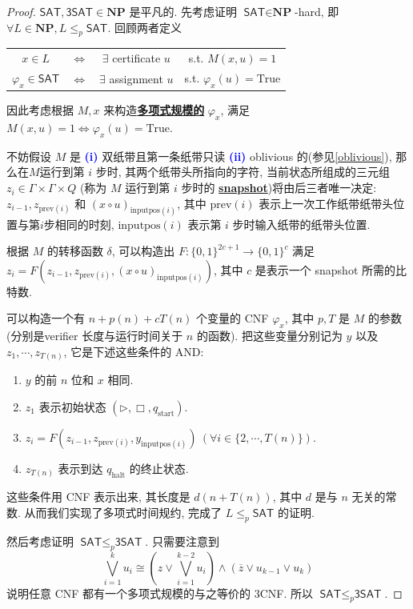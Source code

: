 \documentclass[8pt]{article}
\theoremstyle{compact}
\def\obj#1{\textbf{\uline{#1}}}
\def\num#1{\textnormal{\textbf{\mbox{\textcolor{blue}{(#1)}}}}}
\def\le{\leqslant}
\def\NP{\textbf{NP}}
\begin{document}
\begin{proof}
	$\textsf{SAT}, \textsf{3SAT} \in \NP$ 是平凡的. 先考虑证明 $\textsf{SAT} \in \NP$-hard, 即 $\forall L \in \NP, L \le_p \textsf{SAT}$. 回顾两者定义
	\begin{center}		
		\begin{tabular}{cccc}
			$x \in L$ & $\Leftrightarrow$ & $\exists$ certificate $u$ & s.t. $M(x, u) = 1$\\
			$\varphi_x \in \textsf{SAT}$ & $\Leftrightarrow$ & $\exists$ assignment $u$ & s.t. $\varphi_x(u) = \text{True}$\\
		\end{tabular}
	\end{center}
	因此考虑根据 $M, x$ 来构造\obj{多项式规模的} $\varphi_x$, 满足 $M(x, u) = 1 \Leftrightarrow \varphi_x(u) = \text{True}$. 
	
	不妨假设 $M$ 是 \num{i} 双纸带且第一条纸带只读 \num{ii} oblivious 的(参见\cref{oblivious}), 那么在$M$运行到第 $i$ 步时, 其两个纸带头所指向的字符, 当前状态所组成的三元组 $z_i \in \Gamma \times \Gamma \times Q$ (称为 $M$ 运行到第 $i$ 步时的 \obj{snapshot})将由后三者唯一决定: $z_{i-1}, z_{\text{prev}(i)}$ 和 $(x \circ u)_{\text{inputpos}(i)}$, 其中 $\text{prev}(i)$ 表示上一次工作纸带纸带头位置与第$i$步相同的时刻, $\text{inputpos}(i)$ 表示第 $i$ 步时输入纸带的纸带头位置.

	根据 $M$ 的转移函数 $\delta$, 可以构造出 $F: \{0, 1\}^{2c+1} \to \{0, 1\}^c$ 满足 $z_i = F(z_{i-1}, z_{\text{prev}(i)}, (x \circ u)_{\text{inputpos}(i)})$, 其中 $c$ 是表示一个 snapshot 所需的比特数. 

	可以构造一个有 $n + p(n) + cT(n)$ 个变量的 CNF $\varphi_x$, 其中 $p, T$ 是 $M$ 的参数(分别是verifier 长度与运行时间关于 $n$ 的函数). 把这些变量分别记为 $y$ 以及 $z_1, \cdots, z_{T(n)}$, 它是下述这些条件的 AND:
	\begin{enumerate}
		\item $y$ 的前 $n$ 位和 $x$ 相同.
		\item $z_1$ 表示初始状态 $(\triangleright, \Box, q_{\text{start}})$.
		\item $z_i = F(z_{i-1}, z_{\text{prev}(i)}, y_{\text{inputpos}(i)}) \ (\forall i \in \{2, \cdots, T(n)\})$.
		\item $z_{T(n)}$ 表示到达 $q_{\text{halt}}$ 的终止状态.
	\end{enumerate}

	这些条件用 CNF 表示出来, 其长度是 $d(n + T(n))$, 其中 $d$ 是与 $n$ 无关的常数. 从而我们实现了多项式时间规约, 完成了 $L \le_p \textsf{SAT}$ 的证明.

	然后考虑证明 $\textsf{SAT} \le_p \textsf{3SAT}$. 只需要注意到
	$$\bigvee_{i=1}^{k}u_i \cong \left(z \vee \bigvee_{i=1}^{k-2}u_i\right) \wedge (\overline{z} \vee u_{k-1} \vee u_{k})$$
	说明任意 CNF 都有一个多项式规模的与之等价的 3CNF. 所以 $\textsf{SAT} \le_p \textsf{3SAT}$.
\end{proof}
\end{document}
